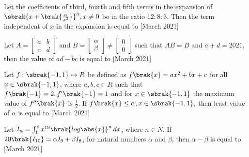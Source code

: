 \iffalse
\title{March 2021, shift 2}
\author{EE24BTECH11062}
\section{integer}
\fi

\item Let the coefficients of third, fourth and fifth terms in the expansion of $\sbrak{x+\brak{\frac{a}{x^2}}}^n, x\neq 0$ be in the ratio $12:8:3$. Then the term independent of $x$ in the expansion is equal to  \hfill{[March 2021]}

\item Let $A=\begin{bmatrix}a & b \\ c& d\end{bmatrix}$ and $B=\begin{bmatrix}\alpha \\ \beta\end{bmatrix}\neq \begin{bmatrix}0\\0\end{bmatrix}$ such that $AB=B$ and $a+d=2021$, then the value of $ad-bc$ is equal to \hfill{[March 2021]}

\item Let $f: \sbrak{-1,1}\mapsto R$ be defined as $f\brak{x}=ax^2 +bx+c$ for all $x\in \sbrak{-1,1}$, where $a,b,c \in R$ such that $f\brak{-1}=2, f^{\prime}\brak{-1}=1$ and for $x\in \sbrak{-1,1}$ the maximum value of $f^{\prime\prime}\brak{x}$ is $\frac{1}{2}$. If $f\brak{x}\leq \alpha, x\in \sbrak{-1,1},$ then least value of $\alpha$ is equal to \hfill{[March 2021]}

\item Let $I_n = 
\int_{1}^{e} x^{19}\brak{log\abs{x}}^n \, dx$, where $n \in N$. If $20\brak{I_{10}}=\alpha I_9+\beta I_8$, for natural numbers $\alpha$ and $\beta$, then $\alpha-\beta$ is equal to \hfill{[March 2021]}

